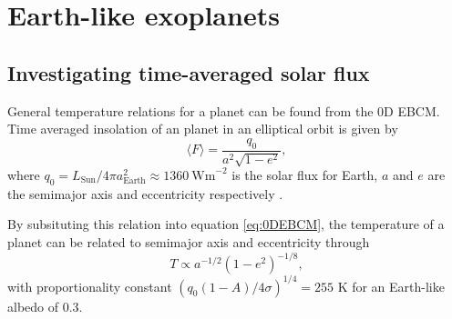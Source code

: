 \documentclass[12pt, onecolumn]{revtex4-2}    %
\begin{document}
\section{Earth-like exoplanets} \label{sec:Exoplanets}
\subsection{Investigating time-averaged solar flux} \label{ssec:InvTimeAveragedSolarFlux}
General temperature relations for a planet can be found from the 0D EBCM.
Time averaged insolation of an planet in an elliptical orbit is given by
\begin{equation}
  \langle F \rangle = \frac{q_0}{a^2 \sqrt{1-e^2}} \label{eq:avgInsolation},
\end{equation}
where $q_0 = L_{\text{Sun}}/4\pi a_{\text{Earth}}^2 \approx 1360 \ \text{Wm}^{-2}$ is the solar flux for Earth, $a$ and $e$ are the semimajor axis and eccentricity respectively \cite{Mendez2017}.

By subsituting this relation into equation \eqref{eq:0DEBCM}, the temperature of a planet can be related to semimajor axis and eccentricity through
\begin{equation}
  T \propto a^{-1/2} (1-e^2)^{-1/8}, \label{eq:T_propto_a_e}
\end{equation}
with proportionality constant $(q_0 (1-A) / 4\sigma)^{1/4} = 255$ K for an Earth-like albedo of 0.3.
\end{document}
